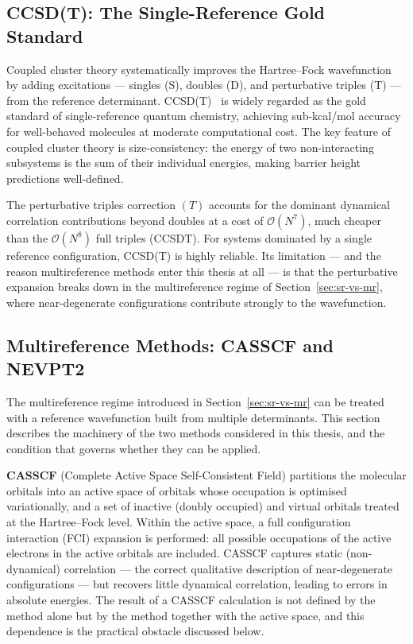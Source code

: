 \subsection{CCSD(T): The Single-Reference Gold Standard}
\label{sec:background-ccsdt}

Coupled cluster theory systematically improves the Hartree--Fock wavefunction by
adding excitations --- singles (S), doubles (D), and perturbative triples (T) ---
from the reference determinant. \mbox{CCSD(T)}~\cite{raghavachari1989} is widely
regarded as the gold standard of single-reference quantum chemistry, achieving
sub-kcal/mol accuracy for well-behaved molecules at moderate computational cost.
The key feature of coupled cluster theory is size-consistency: the energy of two
non-interacting subsystems is the sum of their individual energies, making barrier
height predictions well-defined.

The perturbative triples correction $(T)$ accounts for the dominant dynamical
correlation contributions beyond doubles at a cost of $\mathcal{O}(N^7)$, much
cheaper than the $\mathcal{O}(N^8)$ full triples (CCSDT). For systems dominated
by a single reference configuration, \mbox{CCSD(T)} is highly reliable. Its
limitation --- and the reason multireference methods enter this thesis at all ---
is that the perturbative expansion breaks down in the multireference regime of
Section~\ref{sec:sr-vs-mr}, where near-degenerate configurations contribute
strongly to the wavefunction.

\subsection{Multireference Methods: CASSCF and NEVPT2}
\label{sec:background-mr}

The multireference regime introduced in Section~\ref{sec:sr-vs-mr} can be treated
with a reference wavefunction built from multiple determinants. This section
describes the machinery of the two methods considered in this thesis, and the
condition that governs whether they can be applied.

\textbf{CASSCF} (Complete Active Space Self-Consistent Field) partitions the
molecular orbitals into an active space of orbitals whose occupation is optimised
variationally, and a set of inactive (doubly occupied) and virtual orbitals treated
at the Hartree--Fock level. Within the active space, a full configuration interaction
(FCI) expansion is performed: all possible occupations of the active electrons in the
active orbitals are included. CASSCF captures static (non-dynamical) correlation ---
the correct qualitative description of near-degenerate configurations --- but
recovers little dynamical correlation, leading to errors in absolute energies. The
result of a CASSCF calculation is not defined by the method alone but by the method
together with the active space, and this dependence is the practical obstacle
discussed below.

